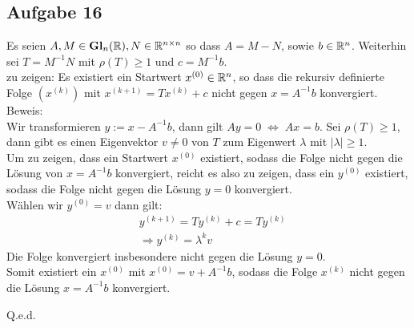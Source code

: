 \subsection*{Aufgabe 16}

Es seien $A,M \in \mathbf{Gl}_n(\mathbb R), N \in \mathbb R^{n\times n}$ so dass $A=M-N$, sowie $b \in \mathbb R^n$. Weiterhin sei $T=M^{-1}N$ mit $\rho(T)\ge 1$ und $c=M^{-1}b$.\\
zu zeigen: Es existiert ein Startwert $x^{(0)} \in \mathbb R^n$, so dass die rekursiv definierte Folge $(x^{(k)})$ mit $x^{(k+1)}=Tx^{(k)}+c$ nicht gegen $x=A^{-1}b$ konvergiert.\\
\newline
Beweis:\\
Wir transformieren $y := x - A^{-1} b$, dann gilt $A y = 0 \; \Leftrightarrow \; A x = b$.
Sei $\rho(T)\ge 1$, dann gibt es einen Eigenvektor $v \neq 0$ von $T$ zum Eigenwert $\lambda$ mit $|\lambda|\ge 1$.\\
\newline
Um zu zeigen, dass ein Startwert $x^{(0)}$ existiert, sodass die Folge nicht gegen die Lösung von $x=A^{-1}b$ konvergiert, reicht es also zu zeigen, dass ein $y^{(0)}$ existiert, sodass die Folge nicht gegen die Lösung $y=0$ konvergiert.\\
\newline
Wählen wir $y^{(0)}=v$ dann gilt:
\begin{align*}
&y^{(k+1)}=Ty^{(k)}+ {c}=Ty^{(k)}\\
&\Rightarrow y^{(k)}=\lambda^kv
\end{align*}
Die Folge konvergiert insbesondere nicht gegen die Lösung $y = 0$.\\
Somit existiert ein $x^{(0)}$ mit $x^{(0)}=v+A^{-1}b$, sodass die Folge $x^{(k)}$ nicht gegen die Lösung $x=A^{-1}b$ konvergiert.
\begin{flushright}
Q.e.d.
\end{flushright}
